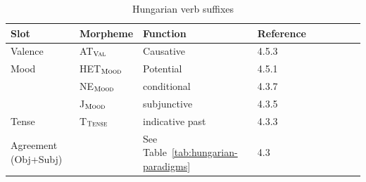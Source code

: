 \documentclass[11pt,letterpaper]{article}
\begin{document}
\begin{table}
    \centering
    \begin{tabular}{lllllllll}
    Slot & Morpheme & Function & Reference    \\ \hline\hline
	    Valence	    & AT$_{\textsc{Val}}$ & Causative &   \cite{rounds2001hungarian} 4.5.3 \\ \hline
Mood	    & HET$_{\textsc{Mood}}$ & Potential &   \cite{rounds2001hungarian} 4.5.1  \\
         & NE$_{\textsc{Mood}}$ & conditional &   \cite{rounds2001hungarian} 4.3.7 \\
         & J$_{\textsc{Mood}}$ & subjunctive &   \cite{rounds2001hungarian} 4.3.5 \\
\hline
	    Tense& T$_{\textsc{Tense}}$ & indicative past &  \cite{rounds2001hungarian} 4.3.3 \\
\hline
Agreement (Obj+Subj)         & & See Table~\ref{tab:hungarian-paradigms} & \cite{rounds2001hungarian} 4.3 \\
         \hline
    \end{tabular}
    \caption{Hungarian verb suffixes}
    \label{tab:hungarian-suffixes}
\end{table}
\end{document}
